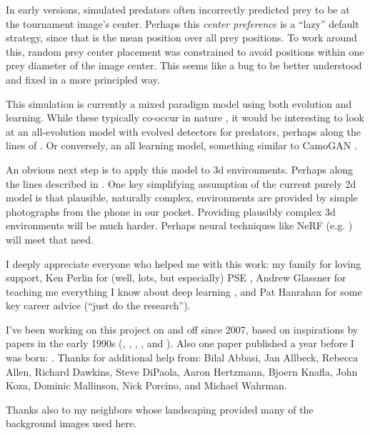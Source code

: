 \documentclass[acmtog]{acmart}
\newcommand{\jargon}[1]{\textit{#1}}
\begin{document}
\par
In early versions, simulated predators often incorrectly predicted prey to be at the tournament image's center. Perhaps this \jargon{center preference} is a “lazy” default strategy, since that is the mean position over all prey positions. To work around this, random prey center placement was constrained to avoid positions within one prey diameter of the image center. This seems like a bug to be better understood and fixed in a more principled way.
\par
This simulation is currently a mixed paradigm model using both evolution and learning. While these typically co-occur in nature \cite{valiant_probably_2013}, it would be interesting to look at an all-evolution model with evolved detectors for predators, perhaps along the lines of \citet{bi_genetic_2022}. Or conversely, an all learning model, something similar to CamoGAN \cite{talas_camogan_2020}.
\par
An obvious next step is to apply this model to 3d environments. Perhaps along the lines described in \citet{miller_color_2022}. One key simplifying assumption of the current purely 2d model is that plausible, naturally complex, environments are provided by simple photographs from the phone in our pocket. Providing plausibly complex 3d environments will be much harder. Perhaps neural techniques like NeRF (e.g. \cite{gao_nerf_2022}) will meet that need.
\par


\begin{acks}
I deeply appreciate everyone who helped me with this work: my family for loving support, Ken Perlin for (well, lots, but especially) PSE \cite{perlin_image_1985}, Andrew Glassner for teaching me everything I know about deep learning \cite{glassner_deep_2021}, and Pat Hanrahan for some key career advice (“just do the research”).
\par
I've been working on this project on and off since 2007, based on inspirations by papers in the early 1990s (\citet{witkin_reaction_1991}, \citet{turk_generating_1991}, \citet{angeline_competitive_1993}, \citet{sims_artificial_1991}, and \citet{sims_evolving_1994}). Also one paper published a year before I was born: \citet{turing_chemical_1952}.
Thanks for additional help from:
Bilal Abbasi,
Jan Allbeck,
Rebecca Allen,
Richard Dawkins,
Steve DiPaola,
Aaron Hertzmann,
Bjoern Knafla,
John Koza,
Dominic Mallinson,
Nick Porcino,
and Michael Wahrman.
\par
Thanks also to my neighbors whose landscaping provided many of the background images used here.
\par
\end{acks}
\end{document}
